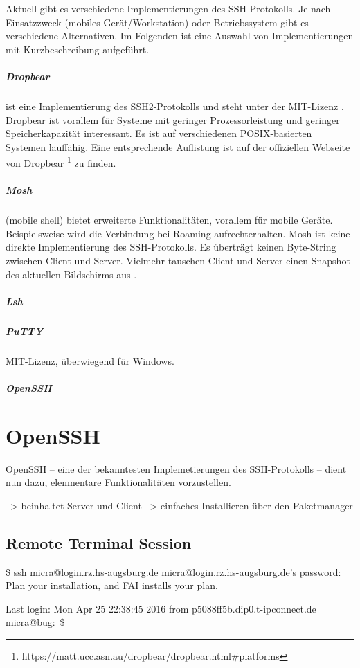 \documentclass[ngerman,pdf]{wkcms}    %
\begin{document}
Aktuell gibt es verschiedene Implementierungen des SSH-Protokolls. Je nach Einsatzzweck (mobiles Gerät/Workstation) oder Betriebssystem gibt es verschiedene Alternativen. Im Folgenden ist eine Auswahl von Implementierungen mit Kurzbeschreibung aufgeführt.

\subparagraph{Dropbear} ist eine Implementierung des SSH2-Protokolls und steht unter der MIT-Lizenz \cite{dropbear}. Dropbear ist vorallem für Systeme mit geringer Prozessorleistung und geringer Speicherkapazität interessant. Es ist auf verschiedenen POSIX-basierten Systemen lauffähig. Eine entsprechende Auflistung ist auf der offiziellen Webseite von Dropbear \footnote{https://matt.ucc.asn.au/dropbear/dropbear.html\#platforms} zu finden.

\subparagraph{Mosh} (mobile shell) bietet erweiterte Funktionalitäten, vorallem für mobile Geräte. Beispielsweise wird die Verbindung bei Roaming aufrechterhalten. Mosh ist keine direkte Implementierung des SSH-Protokolls. Es überträgt keinen Byte-String zwischen Client und Server. Vielmehr tauschen Client und Server einen Snapshot des aktuellen Bildschirms aus \cite{mosh}.

\subparagraph{Lsh}
\subparagraph{PuTTY} MIT-Lizenz, überwiegend für Windows.
\subparagraph{OpenSSH}




\section{OpenSSH}

OpenSSH -- eine der bekanntesten Implemetierungen des SSH-Protokolls -- dient nun dazu,
elemnentare Funktionalitäten vorzustellen. 

--> beinhaltet Server und Client
--> einfaches Installieren über den Paketmanager

\subsection{Remote Terminal Session}

\begin{program}
\$ ssh micra@login.rz.hs-augsburg.de
micra@login.rz.hs-augsburg.de's password:
Plan your installation, and FAI installs your plan.

Last login: Mon Apr 25 22:38:45 2016
from p5088ff5b.dip0.t-ipconnect.de
micra@bug:~\$

\end{program}
\end{document}
